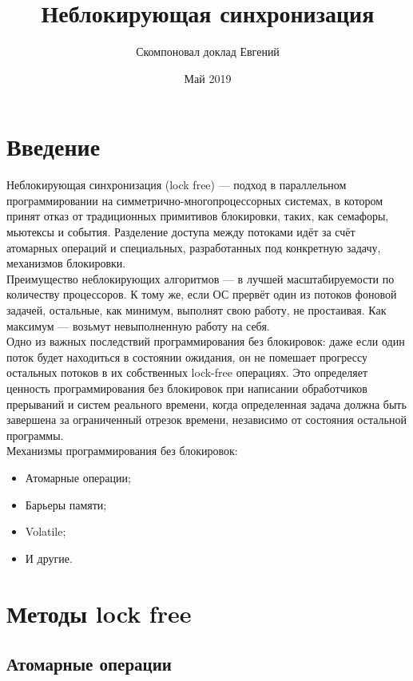 \documentclass{article}
\title{Неблокирующая синхронизация}
\author{Скомпоновал доклад Евгений}
\date{Май 2019}
\begin{document}
\maketitle

\section{Введение}

Неблокирующая синхронизация (lock free) — подход в параллельном программировании на симметрично-многопроцессорных системах, в котором принят отказ от традиционных примитивов блокировки, таких, как семафоры, мьютексы и события. Разделение доступа между потоками идёт за счёт атомарных операций и специальных, разработанных под конкретную задачу, механизмов блокировки.\\

Преимущество неблокирующих алгоритмов — в лучшей масштабируемости по количеству процессоров. К тому же, если ОС прервёт один из потоков фоновой задачей, остальные, как минимум, выполнят свою работу, не простаивая. Как максимум — возьмут невыполненную работу на себя.\\

Одно из важных последствий программирования без блокировок: даже если один поток будет находиться в состоянии ожидания, он не помешает прогрессу остальных потоков в их собственных lock-free операциях. Это определяет ценность программирования без блокировок при написании обработчиков прерываний и систем реального времени, когда определенная задача должна быть завершена за ограниченный отрезок времени, независимо от состояния остальной программы.\\

Механизмы программирования без блокировок:
\begin{itemize}
 \item Атомарные операции;
 \item Барьеры памяти;
 \item Volatile;
 \item И другие.
\end{itemize}

\section{Методы lock free}
\subsection{Атомарные операции}
\end{document}
